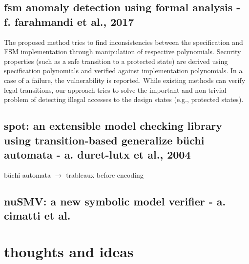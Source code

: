\documentclass[]{article}
\begin{document}
\subsection{fsm anomaly detection using formal analysis - f. farahmandi et al., 2017}

The proposed method tries to find inconsistencies between the specification and FSM implementation through manipulation of respective polynomials.
Security properties (such as a safe transition to a protected state) are derived using specification polynomials and verified against implementation polynomials. In a case of a failure, the vulnerability is reported. While existing methods can verify legal transitions, our approach tries to solve the important and non-trivial problem of detecting illegal accesses to the design states (e.g., protected states). 

\subsection{spot: an extensible model checking library using transition-based generalize b\"uchi automata - a. duret-lutx et al., 2004}

b\"uchi automata $\rightarrow$ trableaux before encoding

\subsection{nuSMV: a new symbolic model verifier - a. cimatti et al.}


\section{thoughts and ideas}
\end{document}
